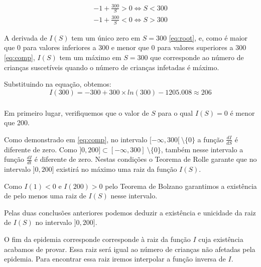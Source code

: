 \documentclass[portuguese, a4paper]{article}
\newcommand\eq[0]{\Leftrightarrow}
\begin{document}
		\begin{equation}
		\begin{split}
			\label{eq:comp}
			 -1 + \frac{300}{S} > 0 \eq S < 300 \\
			 -1 + \frac{300}{S} < 0 \eq S > 300
		\end{split}
		\end{equation}

		\par
		A derivada de $I(S)$ tem um único zero em $S = 300$ \eqref{eq:root},
		e, como é maior que 0 para valores inferiores a 300 e menor que 0
		para valores superiores a 300 \eqref{eq:comp}, $I(S)$ tem um máximo
		em $S = 300$ que corresponde ao número de crianças suscetíveis
		quando o número de crianças infetadas é máximo.

		\par
		Substituindo na equação, obtemos:
		\begin{equation}
			I(300) = -300 + 300 \times ln(300) - 1205.008 \approx 206
		\end{equation}

		\subsubsection{} \label{sec:III.2b)}
		\par
		Em primeiro lugar, verifiquemos que o valor de $S$ para o qual $I(S) = 0$ é menor que 200.

		\par
		Como demonstrado em \eqref{eq:comp}, no intervalo
		$[-\infty,300[~\setminus\{0\}$ a função $\frac{dI}{dS}$ é diferente de
		zero. Como $]0,200] \subset [-\infty,300]~\setminus\{0\}$, também nesse
		intervalo a função $\frac{dI}{dt}$ é diferente de zero. Nestas condições
		o Teorema de Rolle garante que no intervalo $]0,200]$ existirá no máximo
		uma raiz da função $I(S)$.

		\par
		Como $I(1) < 0$ e $I(200) > 0$ pelo Teorema de Bolzano garantimos a
		existência de pelo menos uma raiz de $I(S)$ nesse intervalo.

		\par
		Pelas duas conclusões anteriores podemos deduzir a existência e
		unicidade da raiz de $I(S)$ no intervalo $]0, 200]$.

		\par \null \par
		O fim da epidemia corresponde corresponde à raiz da função $I$ cuja
		existência acabamos de provar. Essa raiz será igual ao número de
		crianças não afetadas pela epidemia. Para encontrar essa raiz iremos
		interpolar a função inversa de $I$.
\end{document}
